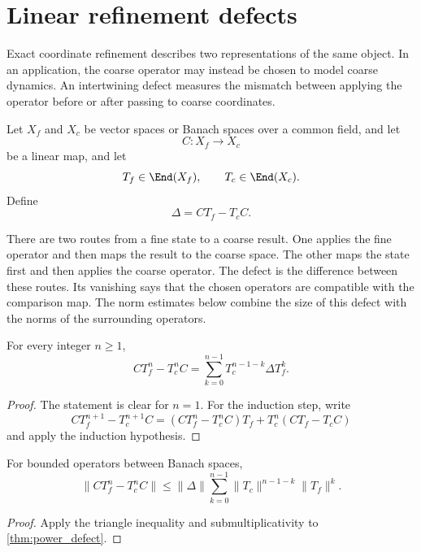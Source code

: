 \section{Linear refinement defects}\label{sec:defects}

Exact coordinate refinement describes two representations of the same object. In an application, the coarse operator may instead be chosen to model coarse dynamics. An intertwining defect measures the mismatch between applying the operator before or after passing to coarse coordinates.

Let $X_f$ and $X_c$ be vector spaces or Banach spaces over a common field, and let
\[
C:X_f\longrightarrow X_c
\]
be a linear map,
and let
\[
T_f\in\End(X_f),
\qquad
T_c\in\End(X_c).
\]
Define
\[
\Delta=CT_f-T_cC.
\]

\begin{keyidea}
There are two routes from a fine state to a coarse result. One applies the fine operator and then maps the result to the coarse space. The other maps the state first and then applies the coarse operator. The defect is the difference between these routes. Its vanishing says that the chosen operators are compatible with the comparison map. The norm estimates below combine the size of this defect with the norms of the surrounding operators.
\end{keyidea}

\begin{theorem}\label{thm:power_defect}\label{thm:power-defect}
For every integer $n\geq1$,
\[
CT_f^n-T_c^nC
=
\sum_{k=0}^{n-1}T_c^{n-1-k}\Delta T_f^k.
\]
\end{theorem}

\begin{proof}
The statement is clear for $n=1$.  For the induction step, write
\[
CT_f^{n+1}-T_c^{n+1}C
=
(CT_f^n-T_c^nC)T_f+T_c^n(CT_f-T_cC)
\]
and apply the induction hypothesis.
\end{proof}

\begin{corollary}\label{cor:power_norm}
For bounded operators between Banach spaces,
\[
\|CT_f^n-T_c^nC\|
\leq
\|\Delta\|
\sum_{k=0}^{n-1}
\|T_c\|^{n-1-k}\|T_f\|^k.
\]
\end{corollary}

\begin{proof}
Apply the triangle inequality and submultiplicativity to \cref{thm:power_defect}.
\end{proof}


